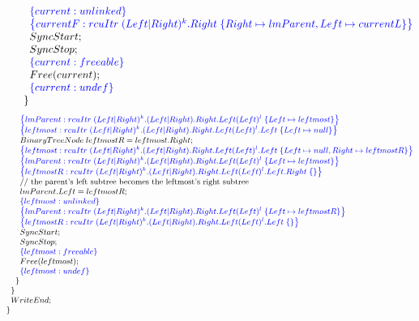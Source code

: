 \[\begin{array}{@{}l@{}}
                \;\;\;\;\;\;\;\;\specline{current:unlinked }\\
                \;\;\;\;\;\;\;\;\specline{currentF:rcuItr \; (Left|Right)^{k}.Right \; \{Right\mapsto lmParent, Left\mapsto currentL\}}\\
                \;\;\;\;\;\;\;\;SyncStart;\\
                \;\;\;\;\;\;\;\;SyncStop;\\
                \;\;\;\;\;\;\;\;\specline{current:freeable}\\
                \;\;\;\;\;\;\;\;Free(current);\\
                \;\;\;\;\;\;\;\;\specline{current:undef}\\
          \;\;\;\;\;\;\}\\
 \end{array}
\]
\[\small
\begin{array}{@{}l@{}}
        \;\;\;\;\;\;\specline{lmParent:rcuItr\; (Left|Right)^{k}.(Left|Right).Right.Left(Left)^{l} \; \{Left \mapsto leftmost\} }\\
        \;\;\;\;\;\;\specline{leftmost:rcuItr\; (Left|Right)^{k}.(Left|Right).Right.Left(Left)^{l}.Left \; \{Left \mapsto null\} }\\
        \;\;\;\;\;\;BinaryTreeNode\; leftmostR = leftmost.Right;\\
        \;\;\;\;\;\;\specline{leftmost:rcuItr\; (Left|Right)^{k}.(Left|Right).Right.Left(Left)^{l}.Left \; \{Left \mapsto null, Right \mapsto leftmostR\} }\\
        \;\;\;\;\;\;\specline{lmParent:rcuItr\; (Left|Right)^{k}.(Left|Right).Right.Left(Left)^{l} \; \{Left \mapsto leftmost\} }\\
        \;\;\;\;\;\;\specline{leftmostR:rcuItr\; (Left|Right)^{k}.(Left|Right).Right.Left(Left)^{l}.Left.Right \; \{\} }\\
        \;\;\;\;\;\;\text{// the parent's left subtree becomes the leftmost's right subtree}\\
        \;\;\;\;\;\;lmParent.Left = leftmostR;\\
        \;\;\;\;\;\;\specline{leftmost:unlinked  }\\
        \;\;\;\;\;\;\specline{lmParent:rcuItr\; (Left|Right)^{k}.(Left|Right).Right.Left(Left)^{l} \; \{Left \mapsto leftmostR\} }\\
        \;\;\;\;\;\;\specline{leftmostR:rcuItr\; (Left|Right)^{k}.(Left|Right).Right.Left(Left)^{l}.Left \; \{\} }\\
        \;\;\;\;\;\;SyncStart;\\
        \;\;\;\;\;\;SyncStop;\\
		\;\;\;\;\;\;\specline{leftmost:freeable}\\
        \;\;\;\;\;\;Free(leftmost);\\
        \;\;\;\;\;\;\specline{leftmost:undef}\\
        \;\;\;\;\}\\
    \;\;\}\\
     \;\;WriteEnd;\\
\}

\end{array}
\]

